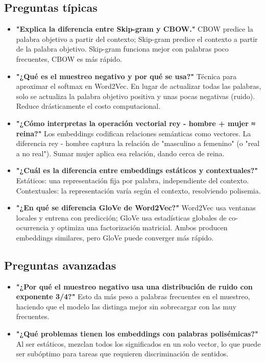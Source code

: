 \documentclass[12pt,a4paper,openany,oneside]{book}
\begin{document}
\subsection{Preguntas típicas}
\begin{itemize}
    \item \textbf{"Explica la diferencia entre Skip-gram y CBOW."}
    CBOW predice la palabra objetivo a partir del contexto; Skip-gram predice el contexto a partir de la palabra objetivo. Skip-gram funciona mejor con palabras poco frecuentes, CBOW es más rápido.
    
    \item \textbf{"¿Qué es el muestreo negativo y por qué se usa?"}
    Técnica para aproximar el softmax en Word2Vec. En lugar de actualizar todas las palabras, solo se actualiza la palabra objetivo positiva y unas pocas negativas (ruido). Reduce drásticamente el costo computacional.
    
    \item \textbf{"¿Cómo interpretas la operación vectorial rey - hombre + mujer ≈ reina?"}
    Los embeddings codifican relaciones semánticas como vectores. La diferencia rey - hombre captura la relación de "masculino a femenino" (o "real a no real"). Sumar mujer aplica esa relación, dando cerca de reina.
    
    \item \textbf{"¿Cuál es la diferencia entre embeddings estáticos y contextuales?"}
    Estáticos: una representación fija por palabra, independiente del contexto. Contextuales: la representación varía según el contexto, resolviendo polisemia.
    
    \item \textbf{"¿En qué se diferencia GloVe de Word2Vec?"}
    Word2Vec usa ventanas locales y entrena con predicción; GloVe usa estadísticas globales de co-ocurrencia y optimiza una factorización matricial. Ambos producen embeddings similares, pero GloVe puede converger más rápido.
\end{itemize}

\subsection{Preguntas avanzadas}
\begin{itemize}
    \item \textbf{"¿Por qué el muestreo negativo usa una distribución de ruido con exponente 3/4?"}
    Esto da más peso a palabras frecuentes en el muestreo, haciendo que el modelo las distinga mejor sin sobrecargar con las muy frecuentes.
    
    \item \textbf{"¿Qué problemas tienen los embeddings con palabras polisémicas?"}
    Al ser estáticos, mezclan todos los significados en un solo vector, lo que puede ser subóptimo para tareas que requieren discriminación de sentidos.
\end{itemize}
\end{document}
